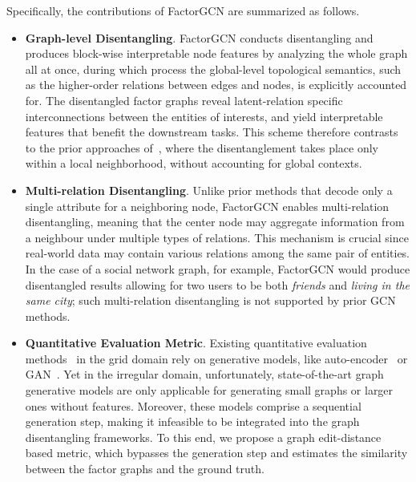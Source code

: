 \documentclass{article}
\begin{document}
Specifically, the contributions of FactorGCN are summarized as follows.

\begin{itemize}
  \item {\bf Graph-level Disentangling}. 
  FactorGCN conducts disentangling and produces block-wise
  interpretable node features by analyzing the whole graph
  all at once, during which process the global-level topological semantics,
  such as the higher-order relations between edges and nodes,
  is explicitly accounted for. The disentangled factor graphs
  reveal latent-relation specific interconnections between
  the entities of interests, and yield interpretable features 
  that benefit the downstream tasks. 
  This scheme therefore contrasts to the prior approaches of~\citep{ma2019disentangled,liu2019independence},
  where the {disentanglement takes place only within a local neighborhood, without accounting for global contexts}.
  
  \item {\bf Multi-relation Disentangling}. 
  Unlike prior methods that decode only
  a single attribute for a neighboring node,
  FactorGCN enables multi-relation 
  disentangling, meaning that
  {the center node may aggregate information
  from a neighbour under multiple types of relations}.
  This mechanism is crucial since real-world  
  data may contain various relations among the 
  same pair of entities.
  In the case of a social network graph, for example,
  FactorGCN would produce disentangled results
  allowing for two users to be both \emph{friends}
  and \emph{living in the same city}; such
  multi-relation disentangling is not supported by prior
  GCN methods.
  
  \item {\bf Quantitative Evaluation Metric}.
  Existing quantitative evaluation methods~\citep{eastwood2018framework,burgess2018understanding}
  in the grid domain rely on 
  generative models, like auto-encoder~\citep{kim2018disentangling}
  or GAN~\citep{chen2016infogan}.
  Yet in the irregular domain, 
  unfortunately, state-of-the-art graph generative models 
  are only applicable for generating small graphs or
  larger ones without features.
  {Moreover, these models comprise a sequential generation step,
  making it infeasible to be integrated into the graph disentangling frameworks.}
  To this end, we propose a graph edit-distance based metric,
  which bypasses the generation step
  and estimates the similarity between the factor graphs and the ground truth.
  
\end{itemize}
  
\end{document}
